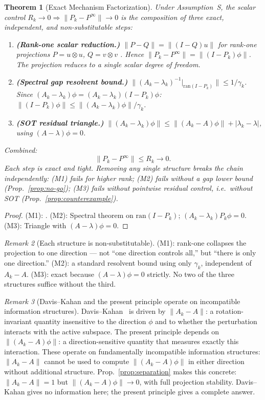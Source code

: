 \documentclass[12pt,a4paper]{amsart}
\newtheorem{theorem}{Theorem}[section]
\theoremstyle{definition}
\theoremstyle{remark}
\newtheorem{remark}[theorem]{Remark}
\begin{document}
\begin{theorem}[Exact Mechanism
  Factorization]
\label{thm:mechanism}
Under Assumption~S, the scalar
control $R_k\to 0
\Rightarrow\|P_k-P^\infty\|\to 0$
is the composition of three exact,
independent, and non-substitutable
steps:
\begin{enumerate}[\rm(M1)]
\item\label{M1}
  \textbf{(Rank-one scalar reduction.)}
  $\|P-Q\|=\|(I-Q)u\|$
  for rank-one projections
  $P=u\otimes u$, $Q=v\otimes v$
  \textup{\cite[Ch.~1]{Bhatia1997}}.
  Hence $\|P_k-P^\infty\|
  =\|(I-P_k)\phi\|$.
  The projection reduces to a single
  scalar degree of freedom.
\item\label{M2}
  \textbf{(Spectral gap resolvent
  bound.)}
  $\|(A_k-\lambda_k)^{-1}
  |_{\mathrm{ran}(I-P_k)}\|
  \le 1/\gamma_k$.
  Since $(A_k-\lambda_k)\phi
  =(A_k-\lambda_k)(I-P_k)\phi$:
  $\|(I-P_k)\phi\|
  \le\|(A_k-\lambda_k)\phi\|/\gamma_k$.
\item\label{M3}
  \textbf{(SOT residual triangle.)}
  $\|(A_k-\lambda_k)\phi\|
  \le\|(A_k-A)\phi\|
  +|\lambda_k-\lambda|$,
  using $(A-\lambda)\phi=0$.
\end{enumerate}
Combined:
\[
  \|P_k-P^\infty\| \le R_k \to 0.
\]
Each step is exact and tight.
Removing any single structure
breaks the chain independently:
(M1) fails for higher rank;
(M2) fails without a gap lower bound
(Prop.~\ref{prop:no-go});
(M3) fails without pointwise residual
control, i.e.\ without SOT
(Prop.~\ref{prop:counterexample}).
\end{theorem}
\begin{proof}
(M1): \cite[Ch.~1]{Bhatia1997}.
(M2): Spectral theorem on
$\mathrm{ran}(I-P_k)$;
$(A_k-\lambda_k)P_k\phi=0$.
(M3): Triangle with $(A-\lambda)\phi=0$.
\end{proof}

\begin{remark}[Each structure is
  non-substitutable]
\label{rem:chain-exact}
(M1): rank-one collapses the projection
to one direction --- not ``one direction
controls all,'' but ``there is only
one direction.''
(M2): a standard resolvent bound using
only $\gamma_k$, independent of $A_k-A$.
(M3): exact because $(A-\lambda)\phi=0$
strictly.
No two of the three structures suffice
without the third.
\end{remark}

\begin{remark}[Davis--Kahan and the
  present principle operate on
  incompatible information structures]
\label{rem:input-comparison}
Davis--Kahan~\cite{DavisKahan1970}
is driven by $\|A_k-A\|$: a
rotation-invariant quantity insensitive
to the direction $\phi$ and to whether
the perturbation interacts with the
active subspace.
The present principle depends on
$\|(A_k-A)\phi\|$: a direction-sensitive
quantity that measures exactly this
interaction.
These operate on fundamentally
incompatible information structures:
$\|A_k-A\|$ cannot be used to compute
$\|(A_k-A)\phi\|$ in either direction
without additional structure.
Prop.~\ref{prop:separation} makes
this concrete: $\|A_k-A\|=1$ but
$\|(A_k-A)\phi\|\to 0$, with full
projection stability.
Davis--Kahan gives no information here;
the present principle gives a complete
answer.
\end{remark}
\end{document}
